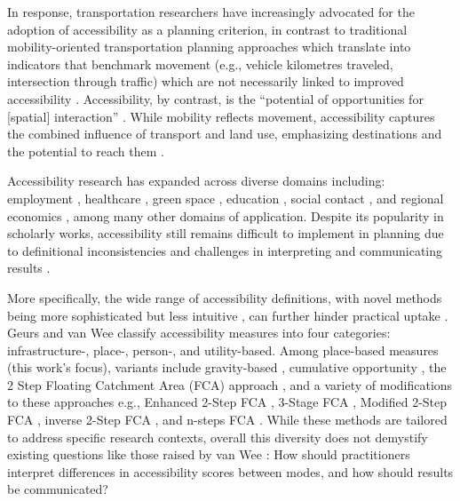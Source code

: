 \documentclass[
  10pt,
  letterpaper,
]{article}
\begin{document}
In response, transportation researchers have increasingly advocated for
the adoption of accessibility as a planning criterion, in contrast to
traditional mobility-oriented transportation planning approaches which
translate into indicators that benchmark movement (e.g., vehicle
kilometres traveled, intersection through traffic) which are not
necessarily linked to improved accessibility
\citep{silvaAccessibilityInstrumentsPlanning2017, paez_developing_2013, handy2020, elgeneidyMakingAccessibilityWork2022}.
Accessibility, by contrast, is the ``potential of opportunities for
{[}spatial{]} interaction'' \citep{hansen1959}. While mobility reflects
movement, accessibility captures the combined influence of transport and
land use, emphasizing destinations and the potential to reach them
\citep{handyMeasuringAccessibilityExploration1997}.

Accessibility research has expanded across diverse domains including:
employment
\citep{karstEvaluationAccessibilityImpacts2003, grengs2010job, paez_jobs_2013, merlin2017competition, tao_investigating_2020},
healthcare
\citep{luo2003, paez_healthcare_2010, wan2012three, delamater2013spatial, boisjoly2017informality, pereira_2021_geographic, yang2024evaluating},
green space
\citep{reyesAccessibility2014, rojas_accessibility_2016, liang_novel_2024},
education
\citep{williams_disparities_2014, romanillosAccessibilitySchoolsSpatial2018, marques_accessibility_2021},
social contact
\citep{neutens_human_2007, farberActivitySpacesMeasurement2012, farber_2013_social},
and regional economics
\citep{vickermanAccessibility1999, lopezMeasuring2008, ribeiro_road_2010, gutierrez_evaluating_2011},
among many other domains of application. Despite its popularity in
scholarly works, accessibility still remains difficult to implement in
planning due to definitional inconsistencies
\citep{vanweeAccessible2016, handy2020, kapatsila_resolving_2023} and
challenges in interpreting and communicating results
\citep{geursAccessibilityEvaluationLanduse2004, vanweeAccessible2016, ferreiraReenactingMobilityAccessibility2020}.

More specifically, the wide range of accessibility definitions, with
novel methods being more sophisticated but less intuitive
\citep{kapatsila_resolving_2023}, can further hinder practical uptake
\citep{vanweeAccessible2016}. Geurs and van Wee
\citep{geursAccessibilityEvaluationLanduse2004} classify accessibility
measures into four categories: infrastructure-, place-, person-, and
utility-based. Among place-based measures (this work's focus), variants
include gravity-based \citep{hansen1959}, cumulative opportunity
\citep{pirie_measuring_1979}, the 2 Step Floating Catchment Area (FCA)
approach \citep{luo2003}, and a variety of modifications to these
approaches e.g., Enhanced 2-Step FCA \citep{luoEnhanced2009}, 3-Stage
FCA \citep{wan2012three}, Modified 2-Step FCA
\citep{delamater2013spatial}, inverse 2-Step FCA
\citep{wang_2sfca_2021}, and n-steps FCA \citep{liang_novel_2024}. While
these methods are tailored to address specific research contexts,
overall this diversity does not demystify existing questions like those
raised by van Wee \citep{vanweeAccessible2016}: How should practitioners
interpret differences in accessibility scores between modes, and how
should results be communicated?
\end{document}
